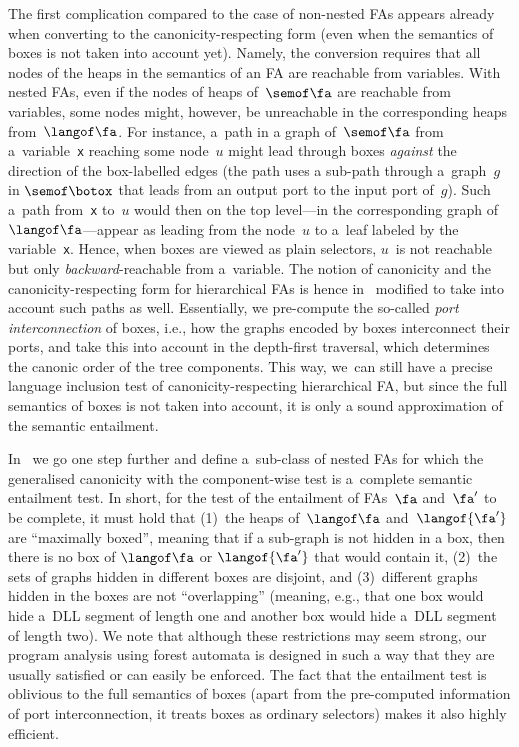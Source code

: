 The first complication compared to the case of non-nested FAs appears already
when converting to the canonicity-respecting form (even when the semantics of
boxes is not taken into account yet).
%
Namely, the conversion requires that all nodes of the heaps in
the semantics of an FA are reachable from variables.
%
With nested FAs, even if the nodes of heaps of~$\semof\fa$ are reachable from variables, 
some nodes might, however, be unreachable in the corresponding heaps from~$\langof\fa$. 
%
For instance, a~path in a graph of~$\semof\fa$ from a~variable~\texttt{x}
reaching some node~$u$ might lead through boxes \emph{against} the direction of
the box-labelled edges (the path uses a sub-path through a~graph~$g$ in
$\semof\botox$ that leads from an output port to the input port of~$g$).
%
Such a~path from~\texttt{x} to~$u$ would then on the top level---in
the corresponding graph of~$\langof\fa$---appear as leading from the node~$u$ to
a~leaf labeled by the variable~\texttt{x}.
Hence, when boxes are viewed as plain selectors, $u$~is not reachable but only
\emph{backward}-reachable from a~variable.
%
The notion of canonicity and the canonicity-respecting form for hierarchical FAs
is hence in~\cite{forester12,jiri:diza} modified to take into account
such paths as well.
%
Essentially, we pre-compute the so-called \emph{port interconnection} of boxes,
i.e., how the graphs encoded by boxes interconnect their ports, and take this
into account in the depth-first traversal, which determines the canonic order of
the tree components.
%
This way, we~can still have a precise language inclusion test of canonicity-respecting hierarchical FA,
but since the full semantics of boxes is not taken into account, it is only a sound approximation of the semantic entailment.

In~\cite{habermehl:forest,jiri:diza} we go one step further and define
a~sub-class of nested FAs for which the generalised canonicity with the
component-wise test is a~complete semantic entailment test.
In short, for the test of the entailment of FAs~$\fa$ and~$\fa'$ to be complete, it must hold that
(1)~the heaps of~$\langof\fa$ and~$\langof{\fa'}$ are ``maximally boxed'',
meaning that if a sub-graph is not hidden in a box, then there is no box of
$\langof\fa$ or $\langof{\fa'}$ that would contain it,
(2)~the sets of graphs hidden in different boxes are disjoint,
and (3)~different graphs hidden in the boxes are not ``overlapping'' (meaning,
e.g., that one box would hide a~DLL segment of length one and another box would
hide a~DLL segment of length two).
%
We note that although these restrictions may seem strong, 
%
our program analysis using forest automata is designed in such a way that
they are usually satisfied or can easily be enforced.
%
The fact that the entailment test is oblivious to the full semantics of boxes (apart from the pre-computed information of port interconnection, it treats boxes as ordinary selectors) makes it also highly efficient.


